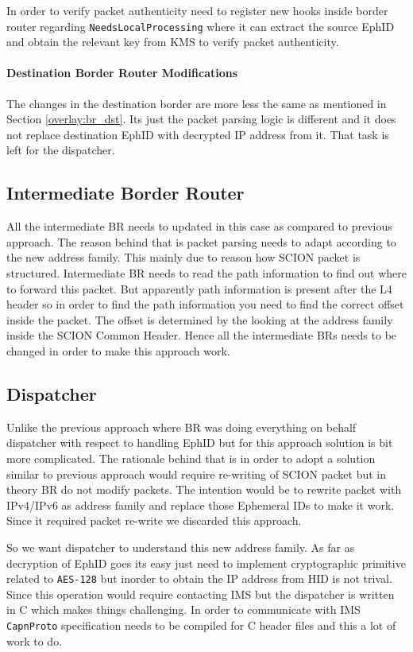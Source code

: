 In order to verify packet authenticity need to register new hooks inside border router regarding \texttt{NeedsLocalProcessing} where it can extract the source EphID and obtain the relevant key from KMS to verify packet authenticity.

\paragraph{Destination Border Router Modifications}
The changes in the destination border are more less the same as mentioned in Section \ref{overlay:br_dst}. Its just the packet parsing logic is different and it does not replace destination EphID with decrypted IP address from it. That task is left for the dispatcher.  

\subsection{Intermediate Border Router}
All the intermediate BR needs to updated in this case as compared to previous approach. The reason behind that is packet parsing needs to adapt according to the new address family. This mainly due to reason how SCION packet is structured. Intermediate BR needs to read the path information to find out where to forward this packet. But apparently path information is present after the L4 header so in order to find the path information you need to find the correct offset inside the packet. The offset is determined by the looking at the address family inside the SCION Common Header. Hence all the intermediate BRs needs to be changed in order to make this approach work.

\subsection{Dispatcher}
Unlike the previous approach where BR was doing everything on behalf dispatcher with respect to handling EphID but for this approach solution is bit more complicated. The rationale behind that is in order to adopt a solution similar to previous approach would require re-writing of SCION packet but in theory BR do not modify packets. The intention would be to rewrite packet with IPv4/IPv6 as address family and replace those Ephemeral IDs to make it work. Since it required packet re-write we discarded this approach.

So we want dispatcher to understand this new address family. As far as decryption of EphID goes its easy just need to implement cryptographic primitive related to \texttt{AES-128} but inorder to obtain the IP address from HID is not trival. Since this operation would require contacting IMS but the dispatcher is written in C which makes things challenging. In order to communicate with IMS \texttt{CapnProto} specification needs to be compiled for C header files and this a lot of work to do.

